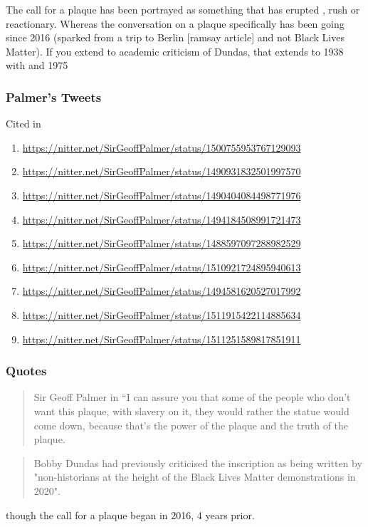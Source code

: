 \documentclass{scrartcl}
\begin{document}
The call for a plaque has been portrayed as something that has erupted \cite{daily_2017}, rush or reactionary. Whereas the conversation on a plaque specifically has been going since 2016 (sparked from a trip to Berlin [ramsay article] and not Black Lives Matter). If you extend to academic criticism of Dundas, that extends to 1938 with \cite{williams_1938} and 1975 \cite{davis_1975}

\subsubsection{Palmer's Tweets}

Cited in \cite{mccarthy_2022_2}

\begin{enumerate}
    \item \url{https://nitter.net/SirGeoffPalmer/status/1500755953767129093}
    \item \url{https://nitter.net/SirGeoffPalmer/status/1490931832501997570}
    \item \url{https://nitter.net/SirGeoffPalmer/status/1490404084498771976}
    \item \url{https://nitter.net/SirGeoffPalmer/status/1494184508991721473}
    \item \url{https://nitter.net/SirGeoffPalmer/status/1488597097288982529}
    \item \url{https://nitter.net/SirGeoffPalmer/status/1510921724895940613}
    \item \url{https://nitter.net/SirGeoffPalmer/status/1494581620527017992}
    \item \url{https://nitter.net/SirGeoffPalmer/status/1511915422114885634}
    \item \url{https://nitter.net/SirGeoffPalmer/status/1511251589817851911}
\end{enumerate}

\subsubsection{Quotes}
\begin{quotation}{Sir Geoff Palmer in \cite{anderson_2021}}
    “I can assure you that some of the people who don’t want this plaque, with slavery on it, they would rather the statue would come down, because that’s the power of the plaque and the truth of the plaque.
\end{quotation}
\begin{quote}
    Bobby Dundas had previously criticised the inscription as being written by "non-historians at the height of the Black Lives Matter demonstrations in 2020".
\end{quote}\cite{bbc_2024} though the call for a plaque began in 2016, 4 years prior.
\end{document}
